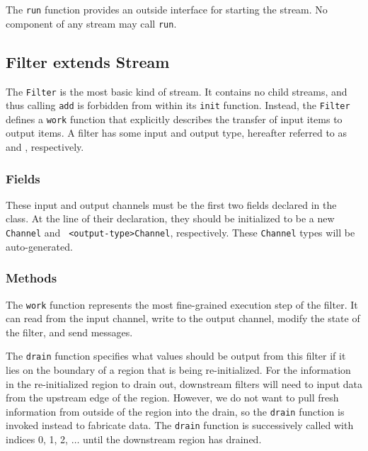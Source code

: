  The {\tt run} function provides an outside
interface for starting the stream.  No component of any stream may
call {\tt run}.

\subsection{Filter extends Stream}

The {\tt Filter} is the most basic kind of stream.  It contains no
child streams, and thus calling {\tt add} is forbidden from within its
{\tt init} function.  Instead, the {\tt Filter} defines a {\tt work}
function that explicitly describes the transfer of input items to
output items.  A filter has some input and output type, hereafter
referred to as {\tt <input-type>} and {\tt <output-type>},
respectively.

\subsubsection{Fields} 

These input and output channels must be the first two fields declared
in the class.  At the line of their declaration, they should be
initialized to be a new {\tt <input-type>Channel} and {\tt
<output-type>Channel}, respectively.  These {\tt Channel} types will
be auto-generated.

\subsubsection{Methods}

  The {\tt work} function represents the most
fine-grained execution step of the filter.  It can read from the input
channel, write to the output channel, modify the state of the filter,
and send messages.

  The {\tt drain} function
specifies what values should be output from this filter if it lies on
the boundary of a region that is being re-initialized.  For the
information in the re-initialized region to drain out, downstream
filters will need to input data from the upstream edge of the region.
However, we do not want to pull fresh information from outside of the
region into the drain, so the {\tt drain} function is invoked instead
to fabricate data.  The {\tt drain} function is successively called
with indices 0, 1, 2, $\dots$ until the downstream region has drained.

